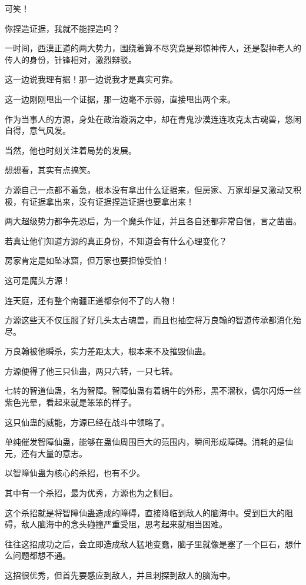 \begin{this_body}
可笑！

你捏造证据，我就不能捏造吗？

一时间，西漠正道的两大势力，围绕着算不尽究竟是郑惊神传人，还是裂神老人的传人的身份，针锋相对，激烈辩驳。

这一边说我理有据！那一边说我才是真实可靠。

这一边刚刚甩出一个证据，那一边毫不示弱，直接甩出两个来。

作为当事人的方源，身处在政治漩涡之中，却在青鬼沙漠连连攻克太古魂兽，悠闲自得，意气风发。

当然，他也时刻关注着局势的发展。

想想看，其实有点搞笑。

方源自己一点都不着急，根本没有拿出什么证据来，但房家、万家却是又激动又积极，有证据拿出来，没有证据捏造证据也要拿出来！

两大超级势力都争先恐后，为一个魔头作证，并且各自还都非常自信，言之凿凿。

若真让他们知道方源的真正身份，不知道会有什么心理变化？

房家肯定是如坠冰窟，但万家也要担惊受怕！

这可是魔头方源！

连天庭，还有整个南疆正道都奈何不了的人物！

方源这些天不仅压服了好几头太古魂兽，而且也抽空将万良翰的智道传承都消化殆尽。

万良翰被他瞬杀，实力差距太大，根本来不及摧毁仙蛊。

方源便得了他三只仙蛊，两只六转，一只七转。

七转的智道仙蛊，名为智障。智障仙蛊有着蜗牛的外形，黑不溜秋，偶尔闪烁一丝紫色光晕，看起来就是笨笨的样子。

这只仙蛊的威能，方源已经在战斗中领略了。

单纯催发智障仙蛊，能够在蛊仙周围巨大的范围内，瞬间形成障碍。消耗的是仙元，还有大量的意志。

以智障仙蛊为核心的杀招，也有不少。

其中有一个杀招，最为优秀，方源也为之侧目。

这个杀招就是将智障仙蛊造成的障碍，直接降临到敌人的脑海中。受到巨大的阻碍，敌人脑海中的念头碰撞严重受阻，思考起来就相当困难。

往往这招成功之后，会立即造成敌人猛地变蠢，脑子里就像是塞了一个巨石，想什么问题都想不通。

这招很优秀，但首先要感应到敌人，并且刺探到敌人的脑海中。


\end{this_body}
